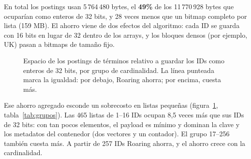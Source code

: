 \documentclass[11pt,a4paper]{article}
\begin{document}
En total los postings usan 5\,764\,480 bytes, el \textbf{49\%} de los 11\,770\,928 bytes que ocuparían como enteros de 32 bits, y 28 veces menos que un bitmap completo por lista (159 MB). El ahorro viene de dos efectos del algoritmo: cada ID se guarda con 16 bits en lugar de 32 dentro de los arrays, y los bloques densos (por ejemplo, UK) pasan a bitmaps de tamaño fijo.

\begin{figure}[htbp]
\centering
{}
\caption{Espacio de los postings de términos relativo a guardar los IDs como enteros de 32 bits, por grupo de cardinalidad. La línea punteada marca la igualdad: por debajo, Roaring ahorra; por encima, cuesta más.}\label{fig:espacio}
\end{figure}

\begin{table}[htbp]
\centering\small

\caption{Postings de términos agrupados por cardinalidad.}\label{tab:grupos}
\end{table}

Ese ahorro agregado esconde un sobrecosto en listas pequeñas (figura~\ref{fig:espacio}, tabla~\ref{tab:grupos}). Las 465 listas de 1--16 IDs ocupan 8,5 veces más que sus IDs de 32 bits: con tan pocos elementos, el payload es mínimo y dominan la clave y los metadatos del contenedor (dos vectores y un contador). El grupo 17--256 también cuesta más. A partir de 257 IDs Roaring ahorra, y el ahorro crece con la cardinalidad.
\end{document}
